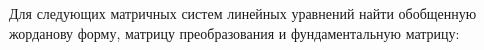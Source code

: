 	Для следующих матричных систем линейных уравнений найти обобщенную жорданову форму, матрицу преобразования и фундаментальную матрицу:
	\begin{multicols}{3}
		\begin{enumtasks}



\end{enumtasks}
\end{multicols}
